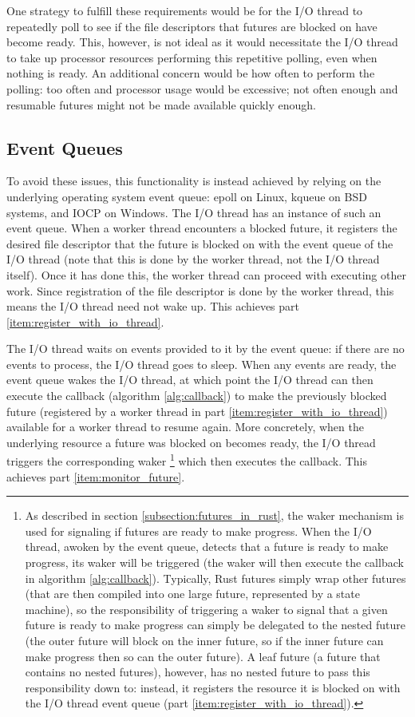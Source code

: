 \documentclass[bsc,frontabs,singlespacing,parskip,deptreport,normalheadings]{infthesis}
\begin{document}
One strategy to fulfill these requirements would be for the I/O thread to
repeatedly poll to see if the file descriptors that futures are blocked on have
become ready. This, however, is not ideal as it would necessitate the I/O thread
to take up processor resources performing this repetitive polling, even when
nothing is ready. An additional concern would be how often to perform the
polling: too often and processor usage would be excessive; not often enough and
resumable futures might not be made available quickly enough.

\subsection{Event Queues}

To avoid these issues, this functionality is instead achieved by relying on the
underlying operating system event queue: epoll on Linux, kqueue on BSD systems,
and IOCP on Windows. The I/O thread has an instance of such an event queue. When
a worker thread encounters a blocked future, it registers the desired file
descriptor that the future is blocked on with the event queue of the I/O thread
(note that this is done by the worker thread, not the I/O thread itself). Once
it has done this, the worker thread can proceed with executing other work. Since
registration of the file descriptor is done by the worker thread, this means the
I/O thread need not wake up. This achieves part
\ref{item:register_with_io_thread}.

The I/O thread waits on events provided to it by the event queue: if there are
no events to process, the I/O thread goes to sleep. When any events are ready,
the event queue wakes the I/O thread, at which point the I/O thread can then
execute the callback (algorithm \ref{alg:callback}) to make the previously
blocked future (registered by a worker thread in part
\ref{item:register_with_io_thread}) available for a worker thread to resume
again. More concretely, when the underlying resource a future was blocked on
becomes ready, the I/O thread triggers the corresponding waker \footnote{ As
    described in section \ref{subsection:futures_in_rust}, the waker mechanism
    is used for signaling if futures are ready to make progress. When the I/O
    thread, awoken by the event queue, detects that a future is ready to make
    progress, its waker will be triggered (the waker will then execute the
    callback in algorithm \ref{alg:callback}). Typically, Rust futures simply
    wrap other futures (that are then compiled into one large future,
    represented by a state machine), so the responsibility of triggering a waker
    to signal that a given future is ready to make progress can simply be
    delegated to the nested future (the outer future will block on the inner
    future, so if the inner future can make progress then so can the outer
    future). A leaf future (a future that contains no nested futures), however,
has no nested future to pass this responsibility down to: instead, it registers
the resource it is blocked on with the I/O thread event queue (part
\ref{item:register_with_io_thread}).} which then executes the callback. This
achieves part \ref{item:monitor_future}.
\end{document}
